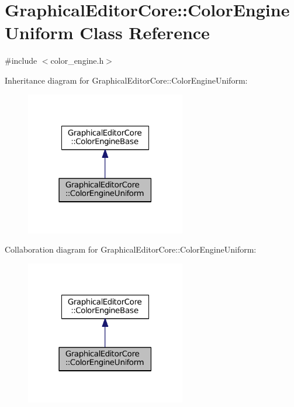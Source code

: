 \hypertarget{classGraphicalEditorCore_1_1ColorEngineUniform}{}\section{Graphical\+Editor\+Core\+:\+:Color\+Engine\+Uniform Class Reference}
\label{classGraphicalEditorCore_1_1ColorEngineUniform}


{\ttfamily \#include $<$color\+\_\+engine.\+h$>$}



Inheritance diagram for Graphical\+Editor\+Core\+:\+:Color\+Engine\+Uniform\+:
\nopagebreak
\begin{figure}[H]
\begin{center}
\leavevmode
\includegraphics[width=198pt]{classGraphicalEditorCore_1_1ColorEngineUniform__inherit__graph}
\end{center}
\end{figure}


Collaboration diagram for Graphical\+Editor\+Core\+:\+:Color\+Engine\+Uniform\+:
\nopagebreak
\begin{figure}[H]
\begin{center}
\leavevmode
\includegraphics[width=198pt]{classGraphicalEditorCore_1_1ColorEngineUniform__coll__graph}
\end{center}
\end{figure}
